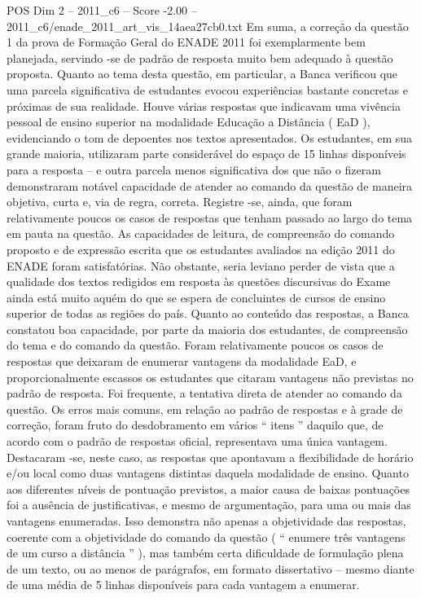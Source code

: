 \begin{textsample}{POS Dim 2 – 2011\_c6 – Score -2.00 – 2011\_c6/enade\_2011\_art\_vis\_14aea27cb0.txt}
Em suma, a correção da questão 1 da prova de Formação Geral do ENADE 2011 foi exemplarmente bem planejada, servindo -se de padrão de resposta muito bem adequado à questão proposta.
Quanto ao tema desta questão, em particular, a Banca verificou que uma parcela significativa de estudantes evocou experiências bastante concretas e próximas de sua realidade.
Houve várias respostas que indicavam uma vivência pessoal de ensino superior na modalidade Educação a Distância ( EaD ), evidenciando o tom de depoentes nos textos apresentados.
Os estudantes, em sua grande maioria, utilizaram parte considerável do espaço de 15 linhas disponíveis para a resposta – e outra parcela menos significativa dos que não o fizeram demonstraram notável capacidade de atender ao comando da questão de maneira objetiva, curta e, via de regra, correta.
Registre -se, ainda, que foram relativamente poucos os casos de respostas que tenham passado ao largo do tema em pauta na questão.
As capacidades de leitura, de compreensão do comando proposto e de expressão escrita que os estudantes avaliados na edição 2011 do ENADE foram satisfatórias.
Não obstante, seria leviano perder de vista que a qualidade dos textos redigidos em resposta às questões discursivas do Exame ainda está muito aquém do que se espera de concluintes de cursos de ensino superior de todas as regiões do país.
Quanto ao conteúdo das respostas, a Banca constatou boa capacidade, por parte da maioria dos estudantes, de compreensão do tema e do comando da questão.
Foram relativamente poucos os casos de respostas que deixaram de enumerar vantagens da modalidade EaD, e proporcionalmente escassos os estudantes que citaram vantagens não previstas no padrão de resposta.
Foi frequente, a tentativa direta de atender ao comando da questão.
Os erros mais comuns, em relação ao padrão de respostas e à grade de correção, foram fruto do desdobramento em vários “ itens ” daquilo que, de acordo com o padrão de respostas oficial, representava uma única vantagem.
Destacaram -se, neste caso, as respostas que apontavam a flexibilidade de horário e/ou local como duas vantagens distintas daquela modalidade de ensino.
Quanto aos diferentes níveis de pontuação previstos, a maior causa de baixas pontuações foi a ausência de justificativas, e mesmo de argumentação, para uma ou mais das vantagens enumeradas.
Isso demonstra não apenas a objetividade das respostas, coerente com a objetividade do comando da questão ( “ enumere três vantagens de um curso a distância ” ), mas também certa dificuldade de formulação plena de um texto, ou ao menos de parágrafos, em formato dissertativo – mesmo diante de uma média de 5 linhas disponíveis para cada vantagem a enumerar.

\end{textsample}
